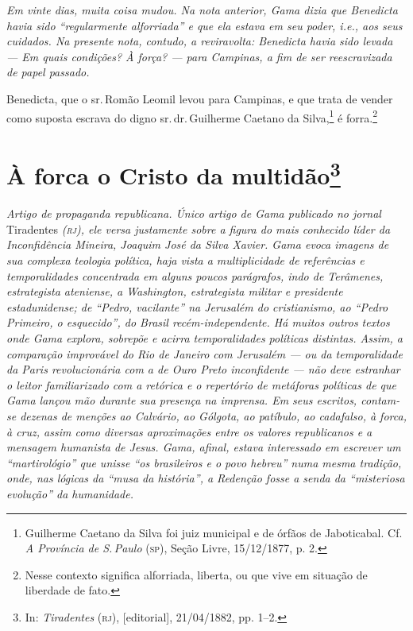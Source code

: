 \begin{resumo}
\emph{Em vinte dias, muita coisa mudou. Na nota anterior, Gama dizia que
Benedicta havia sido ``regularmente alforriada'' e que ela estava em seu
poder, i.e., aos seus cuidados. Na presente nota, contudo, a
reviravolta: Benedicta havia sido levada --- Em quais condições? À força?
--- para Campinas, a fim de ser reescravizada de papel passado.}
\end{resumo}

Benedicta, que o sr.\,Romão Leomil levou para Campinas, e que trata de
vender como suposta escrava do digno sr.\,dr.\,Guilherme Caetano da
Silva,\footnote{Guilherme Caetano da Silva foi juiz municipal e de
  órfãos de Jaboticabal. Cf. \emph{A Província de S.\,Paulo} (\textsc{sp}), Seção
  Livre, 15/12/1877, p. 2.} é forra.\footnote{Nesse contexto significa
  alforriada, liberta, ou que vive em situação de liberdade de fato.}

\chapter{À forca o Cristo da multidão\footnote{In:
  \emph{Tiradentes} (\textsc{rj}), {[}editorial{]}, 21/04/1882, pp. 1--2.}}

\begin{resumo}
\emph{Artigo de propaganda republicana. Único artigo de Gama publicado
no jornal} Tiradentes \emph{(\textsc{rj}), ele versa justamente sobre a figura do
mais conhecido líder da Inconfidência Mineira, Joaquim José da Silva
Xavier. Gama evoca imagens de sua complexa teologia política, haja vista
a multiplicidade de referências e temporalidades concentrada em alguns
poucos parágrafos, indo de Terâmenes, estrategista ateniense, a
Washington, estrategista militar e presidente estadunidense; de ``Pedro,
vacilante'' na Jerusalém do cristianismo, ao ``Pedro Primeiro, o
esquecido'', do Brasil recém-independente. Há muitos outros textos onde
Gama explora, sobrepõe e acirra temporalidades políticas distintas.
Assim, a comparação improvável do Rio de Janeiro com Jerusalém --- ou da
temporalidade da Paris revolucionária com a de Ouro Preto inconfidente
--- não deve estranhar o leitor familiarizado com a retórica e o
repertório de metáforas políticas de que Gama lançou mão durante sua
presença na imprensa. Em seus escritos, contam-se dezenas de menções ao
Calvário, ao Gólgota, ao patíbulo, ao cadafalso, à forca, à cruz, assim
como diversas aproximações entre os valores republicanos e a mensagem
humanista de Jesus. Gama, afinal, estava interessado em escrever um
``martirológio'' que unisse ``os brasileiros e o povo hebreu'' numa mesma
tradição, onde, nas lógicas da ``musa da história'', a Redenção fosse a
senda da ``misteriosa evolução'' da humanidade. }
\end{resumo}

